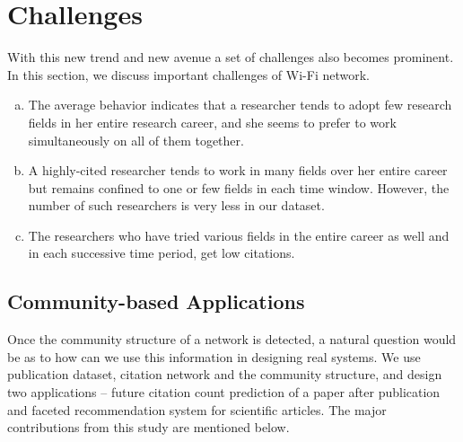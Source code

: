 \section{Challenges}
With this new trend and new avenue a set of challenges also becomes prominent. In this section, we discuss important challenges of Wi-Fi network.\\

\begin{enumerate}[(a)]
\item The average behavior indicates that a researcher tends to adopt few research fields in her entire research career, and she seems to
prefer to work simultaneously on all of them together.

\item A highly-cited researcher tends to work in many fields over her entire career but remains confined to one or few fields in
each time window. However, the number of such researchers is very less in our dataset.  

\item The researchers who have tried various fields in the entire career as well and in each successive time period, get low citations.


\end{enumerate}


\subsection{Community-based Applications}
Once the community structure of a network is detected, a natural question would be as to how can we use this information in designing real
systems. We use publication dataset, citation network and the community structure, and design two applications -- future citation
count prediction of a paper after publication and faceted recommendation system for scientific articles. The major contributions from this
study are mentioned below.

